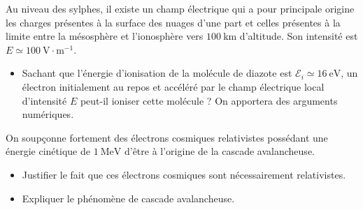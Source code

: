 Au niveau des sylphes, il existe un champ électrique qui a pour principale origine les charges présentes à la surface des nuages d'une part et celles présentes à la limite entre la mésosphère et l'ionosphère vers $100\ \text{km}$ d'altitude. Son intensité est $E \simeq 100\ \text{V}\cdot\text{m}^{-1}$.

\begin{itemize}
    \item[\textbf{21.}] Sachant que l'énergie d'ionisation de la molécule de diazote est $\mathcal{E}_i \simeq 16\ \text{eV}$, un électron initialement au repos et accéléré par le champ électrique local d'intensité $E$ peut-il ioniser cette molécule ? On apportera des arguments numériques.
\end{itemize}

On soupçonne fortement des électrons cosmiques relativistes possédant une énergie cinétique de $1\ \text{MeV}$ d'être à l'origine de la cascade avalancheuse.

\begin{itemize}
    \item[\textbf{22.}] Justifier le fait que ces électrons cosmiques sont nécessairement relativistes.
    \item[\textbf{23.}] Expliquer le phénomène de cascade avalancheuse.
\end{itemize}
